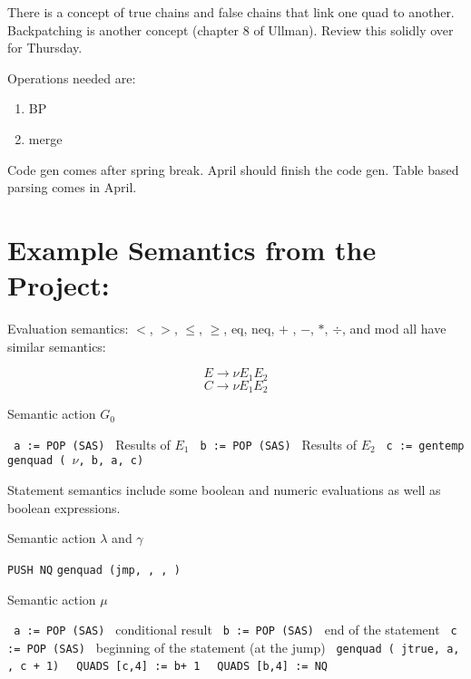 There is a concept of true chains and false chains that link one quad to another.    Backpatching is another concept (chapter 8 of Ullman).    Review this solidly over for Thursday.

Operations needed are:
\begin{enumerate}
\item BP
\item merge
\end{enumerate}


Code gen comes after spring break.    April should finish the code gen.  Table based parsing comes in April.  


\section {Example Semantics from the Project:}
Evaluation semantics:  $<$, $>$, $\le$, $\ge$, eq, neq, $+$ , $-$, $*$, $\div$, and mod  all have similar semantics:

\[ E \to \nu E_1 E_2 \]
\[ C \to \nu E_1 E_2 \]

\begin {algorithm}
\caption{ Semantic action $G_0$ }
\label{alg:G0}
\begin{algorithmic}
\STATE \texttt { a := POP (SAS) }  Results of $E_1$
\STATE \texttt { b := POP (SAS) }  Results of $E_2$
\STATE \texttt { c := gentemp }  
\STATE \texttt { genquad ( $\nu$, b, a, c) }

\end{algorithmic}
\end{algorithm}

Statement semantics include some boolean and numeric evaluations as well as boolean expressions.   

\begin {algorithm}
\caption{ Semantic action $\lambda$ and $\gamma$ }
\label{alg:lambda0}
\begin{algorithmic}
\STATE \texttt {PUSH NQ}
\STATE \texttt {genquad (jmp, , , ) }
\end{algorithmic}
\end{algorithm}

\begin {algorithm}
\caption{ Semantic action $\mu$ }
\label{alg:lambda2}
\begin{algorithmic}
\STATE \texttt { a := POP (SAS) }  conditional result
\STATE \texttt { b := POP (SAS) }  end of the statement
\STATE \texttt { c := POP (SAS) }  beginning of the statement (at the jump)
\STATE \texttt { genquad ( jtrue, a, , c + 1) }
\STATE \texttt { QUADS [c,4] := b+ 1 }
\STATE \texttt { QUADS [b,4] := NQ }
\end{algorithmic}
\end{algorithm}


